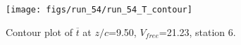 \begin{figure}[H]
\centering
\texttt{[image: figs/run\_54/run\_54\_T\_contour]}
\caption{Contour plot of $\overline{t}$ at $z/c$=9.50, $V_{free}$=21.23, station 6.}
\end{figure}


